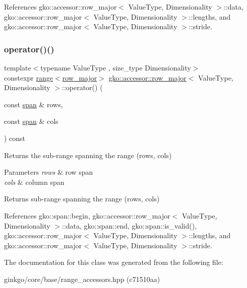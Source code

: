 References gko\+::accessor\+::row\+\_\+major$<$ Value\+Type, Dimensionality $>$\+::data, gko\+::accessor\+::row\+\_\+major$<$ Value\+Type, Dimensionality $>$\+::lengths, and gko\+::accessor\+::row\+\_\+major$<$ Value\+Type, Dimensionality $>$\+::stride.

\mbox{\label{classgko_1_1accessor_1_1row__major_ad1a38f9d96e849ae10de733809a3494d}} 
\subsubsection{\texorpdfstring{operator()()}{operator()()}\hspace{0.1cm}{\footnotesize\ttfamily [2/2]}}
{\footnotesize\ttfamily template$<$typename Value\+Type , size\+\_\+type Dimensionality$>$ \\
constexpr \hyperlink{classgko_1_1range}{range}$<$\hyperlink{classgko_1_1accessor_1_1row__major}{row\+\_\+major}$>$ \hyperlink{classgko_1_1accessor_1_1row__major}{gko\+::accessor\+::row\+\_\+major}$<$ Value\+Type, Dimensionality $>$\+::operator() (\begin{DoxyParamCaption}\item[{const \hyperlink{structgko_1_1span}{span} \&}]{rows,  }\item[{const \hyperlink{structgko_1_1span}{span} \&}]{cols }\end{DoxyParamCaption}) const\hspace{0.3cm}{\ttfamily [inline]}}



Returns the sub-\/range spanning the range (rows, cols) 


\begin{DoxyParams}{Parameters}
{\em rows} & row span \\
\hline
{\em cols} & column span\\
\hline
\end{DoxyParams}
\begin{DoxyReturn}{Returns}
sub-\/range spanning the range (rows, cols) 
\end{DoxyReturn}


References gko\+::span\+::begin, gko\+::accessor\+::row\+\_\+major$<$ Value\+Type, Dimensionality $>$\+::data, gko\+::span\+::end, gko\+::span\+::is\+\_\+valid(), gko\+::accessor\+::row\+\_\+major$<$ Value\+Type, Dimensionality $>$\+::lengths, and gko\+::accessor\+::row\+\_\+major$<$ Value\+Type, Dimensionality $>$\+::stride.



The documentation for this class was generated from the following file\+:\begin{DoxyCompactItemize}
\item 
ginkgo/core/base/range\+\_\+accessors.\+hpp (c71510aa)\end{DoxyCompactItemize}
